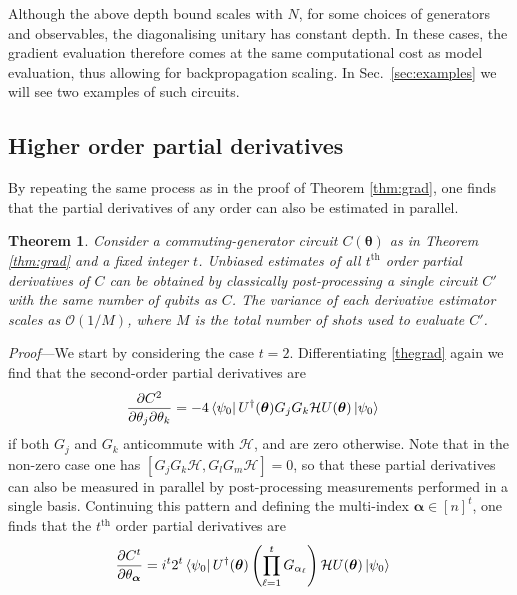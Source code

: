 \documentclass[a4paper,twocolumn,11pt]{quantumarticle}
\newtheorem{theorem}{Theorem}
\renewcommand{\vec}{\boldsymbol}
\begin{document}
Although the above depth bound scales with $N$, for some choices of generators and observables, the diagonalising unitary has constant depth. In these cases, the gradient evaluation therefore comes at the same computational cost as model evaluation, thus allowing for backpropagation scaling. In Sec.\ \ref{sec:examples} we will see two examples of such circuits. 

\subsection{Higher order partial derivatives}
By repeating the same process as in the proof of Theorem \ref{thm:grad}, one finds that the partial derivatives of any order can also be estimated in parallel.

\begin{theorem}\label{thm:pds}
Consider a commuting-generator circuit $C(\vec{\theta})$ as in Theorem \ref{thm:grad} and a fixed integer $t$. Unbiased estimates of all $t^{\text{th}}$ order partial derivatives of $C$ can be obtained by classically post-processing a single circuit $C'$ with the same number of qubits as $C$. The variance of each derivative estimator scales as $\mathcal{O}(1/M)$, where $M$ is the total number of shots used to evaluate $C'$.
\end{theorem}
%
\emph{Proof}---We start by considering the case $t=2$. Differentiating \eqref{thegrad} again we find that the second-order partial derivatives are
\begin{align}
    \frac{\partial C^2}{\partial \theta_j\partial\theta_k} 
    &=-4\bra{\psi_0} U^{\dagger}(\vec{\theta})G_jG_k\mathcal{H}U(\vec{\theta})\ket{\psi_0}
\end{align}
if both $G_j$ and $G_k$ anticommute with $\mathcal{H}$, and are zero otherwise. Note that in the non-zero  case one has $[G_jG_k\mathcal{H},G_lG_m\mathcal{H}]=0$, so that these partial derivatives can also be measured in parallel by post-processing measurements performed in a single basis. Continuing this pattern and defining the multi-index $\vec{\alpha}\in[n]^t$, one finds that the $t^{\text{th}}$ order partial derivatives are
%
\begin{align}
    \frac{\partial C^t}{\partial \theta_{\vec{\alpha}}} &= i^{t}2^t\bra{\psi_0} U^{\dagger}(\vec{\theta})\left(\prod_{\ell=1}^t G_{\alpha_\ell}\right)\mathcal{H}U(\vec{\theta})\ket{\psi_0}
\end{align}
\end{document}
